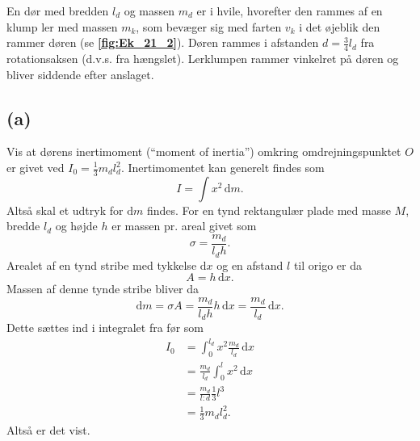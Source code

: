 \documentclass[12pt]{article}
\theoremstyle{definition}
\begin{document}
En dør med bredden $l_d$ og massen $m_d$ er i hvile, hvorefter den rammes af en klump ler med massen $m_k$, som bevæger sig med farten $v_k$ i det øjeblik den rammer døren (se \textbf{\autoref{fig:Ek_21_2}}). Døren rammes i afstanden $d = \frac{3}{4}l_d$ fra rotationsaksen (d.v.s. fra hængslet). Lerklumpen rammer vinkelret på døren og bliver siddende efter anslaget.

\subsection*{(a)}
Vis at dørens inertimoment (``moment of inertia'') omkring omdrejningspunktet $O$ er givet ved $I_0 = \frac{1}{3} m_dl_d^2$.
\bigbreak
Inertimomentet kan generelt findes som
\[ 
I = \int x^2 \, \mathrm{d}m
.\]
Altså skal et udtryk for $\mathrm{d}m$ findes. For en tynd rektangulær plade med masse $M$, bredde $l_d$ og højde $h$ er massen pr. areal givet som
\[ 
\sigma = \frac{m_d}{l_dh}
.\]
Arealet af en tynd stribe med tykkelse $\mathrm{d}x$ og en afstand $l$ til origo er da
\[ 
A = h \, \mathrm{d}x
.\]
Massen af denne tynde stribe bliver da
\[ 
\mathrm{d}m = \sigma A = \frac{m_d}{l_dh} h \, \mathrm{d}x = \frac{m_d}{l_d} \, \mathrm{d}x 
.\]
Dette sættes ind i integralet fra før som
\begin{align*}
  I_0 &= \int_0^{l_d} x^2 \frac{m_d}{l_d} \, \mathrm{d}x  \\
    &= \frac{m_d}{l_d} \int_0^{l} x^2 \, \mathrm{d}x \\
    &= \frac{m_d}{l:d} \frac{1}{3}l^3 \\
    &= \frac{1}{3}m_dl_d^2
.\end{align*}
Altså er det vist. 
\end{document}
